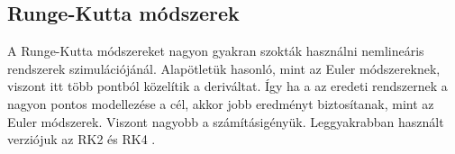 \subsection{Runge-Kutta módszerek}
A Runge-Kutta módszereket nagyon gyakran szokták használni nemlineáris rendszerek szimulációjánál. Alapötletük hasonló, 
mint az Euler módszereknek, viszont itt több pontból közelítik a deriváltat. Így ha a az eredeti rendszernek a nagyon 
pontos modellezése a cél, akkor jobb eredményt biztosítanak, mint az Euler módszerek. Viszont nagyobb a számításigényük. 
Leggyakrabban használt verziójuk az RK2 és RK4 \cite{rkk} \cite{rungekutta}.